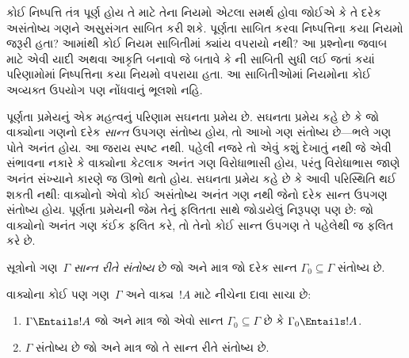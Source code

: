 \begin{prob}
કોઈ નિષ્પત્તિ તંત્ર પૂર્ણ હોય તે માટે તેના નિયમો એટલા સમર્થ હોવા
જોઈએ કે તે દરેક અસંતોષ્ય ગણને અસુસંગત સાબિત કરી શકે. પૂર્ણતા સાબિત કરવા
નિષ્પત્તિના કયા નિયમો જરૂરી હતા? આમાંથી કોઈ નિયમ સાબિતીમાં ક્યાંય
વપરાયો નથી? આ પ્રશ્નોના જવાબ માટે એવી યાદી અથવા આકૃતિ બનાવો જે બતાવે
કે ની સાબિતી સુધી લઈ જતાં કયાં
પરિણામોમાં નિષ્પત્તિના કયા નિયમો વપરાયા હતા. આ સાબિતીઓમાં નિયમોના
કોઈ અવ્યક્ત ઉપયોગ પણ નોંધવાનું ભૂલશો નહિ.
\end{prob}
\endgroup


\begingroup
\makeatletter{}\makeatother


\label{guunit:OLP-0135}


પૂર્ણતા પ્રમેયનું એક મહત્વનું પરિણામ સઘનતા પ્રમેય છે. સઘનતા પ્રમેય
કહે છે કે જો વાક્યોના ગણનો દરેક \emph{સાન્ત} ઉપગણ સંતોષ્ય હોય,
તો આખો ગણ સંતોષ્ય છે—ભલે ગણ પોતે અનંત હોય. આ જરાય સ્પષ્ટ નથી. પહેલી
નજરે તો એવું કશું દેખાતું નથી જે એવી સંભાવના નકારે કે વાક્યોના
કેટલાક અનંત ગણ વિરોધાભાસી હોય, પરંતુ વિરોધાભાસ જાણે અનંત સંખ્યાને
કારણે જ ઊભો થતો હોય. સઘનતા પ્રમેય કહે છે કે આવી પરિસ્થિતિ થઈ શકતી
નથી: વાક્યોનો એવો કોઈ અસંતોષ્ય અનંત ગણ નથી જેનો દરેક સાન્ત ઉપગણ સંતોષ્ય
હોય. પૂર્ણતા પ્રમેયની જેમ તેનું ફલિતતા સાથે જોડાયેલું નિરૂપણ પણ છે:
જો વાક્યોનો અનંત ગણ કંઈક ફલિત કરે, તો તેનો કોઈ સાન્ત ઉપગણ તે
પહેલેથી જ ફલિત કરે છે.

\begin{defn}
  સૂત્રોનો ગણ~$\Gamma$ \emph{સાન્ત રીતે સંતોષ્ય} છે જો અને માત્ર
  જો દરેક સાન્ત $\Gamma_0\subseteq\Gamma$ સંતોષ્ય છે.
\end{defn}

\begin{thm}[સઘનતા પ્રમેય]
વાક્યોના કોઈ પણ ગણ~$\Gamma$ અને વાક્ય~$!A$ માટે નીચેના દાવા
સાચા છે:
\begin{enumerate}
  \item $\Gamma\Entails !A$ જો અને માત્ર જો એવો સાન્ત
    $\Gamma_0\subseteq\Gamma$ છે કે $\Gamma_0\Entails !A$.
  \item $\Gamma$ સંતોષ્ય છે જો અને માત્ર જો તે સાન્ત રીતે સંતોષ્ય છે.
\end{enumerate}
\end{thm}


